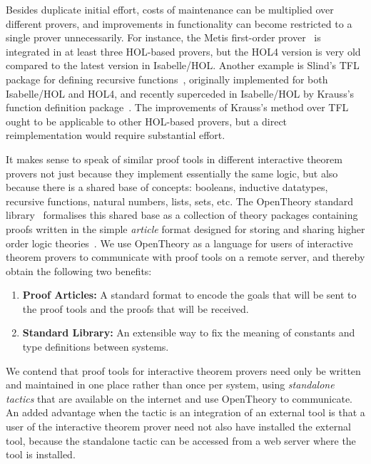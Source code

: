 \documentclass{llncs}
\newcommand{\OpenTheory}{OpenTheory\xspace}
\begin{document}
Besides duplicate initial effort, costs of maintenance can be multiplied over different provers, and improvements in functionality can become restricted to a single prover unnecessarily.
For instance, the Metis first-order prover~\cite{hurd2003d} is integrated in at least three HOL-based provers, but the HOL4 version is very old compared to the latest version in Isabelle/HOL.
Another example is Slind's TFL package for defining recursive functions~\cite{slindphd}, originally implemented for both Isabelle/HOL and HOL4, and recently superceded in Isabelle/HOL by Krauss's function definition package~\cite{DBLP:journals/jar/Krauss10}.
The improvements of Krauss's method over TFL ought to be applicable to other HOL-based provers, but a direct reimplementation would require substantial effort.

It makes sense to speak of similar proof tools in different interactive theorem provers not just because they implement essentially the same logic, but also because there is a shared base of concepts: booleans, inductive datatypes, recursive functions, natural numbers, lists, sets, etc.
The \OpenTheory standard library~\cite{hurd2011} formalises this shared base as a collection of theory packages containing proofs written in the simple \emph{article} format designed for storing and sharing higher order logic theories~\cite{hurd2009}.
We use \OpenTheory as a language for users of interactive theorem provers to communicate with proof tools on a remote server, and thereby obtain the following two benefits:
\begin{enumerate}
\item\textbf{Proof Articles:} A standard format to encode the goals that will be sent to the proof tools and the proofs that will be received.

\item\textbf{Standard Library:} An extensible way to fix the meaning of constants and type definitions between systems.
\end{enumerate}

We contend that proof tools for interactive theorem provers need only be written and maintained in one place rather than once per system, using \emph{standalone tactics} that are available on the internet and use \OpenTheory to communicate.
An added advantage when the tactic is an integration of an external tool is that a user of the interactive theorem prover need not also have installed the external tool, because the standalone tactic can be accessed from a web server where the tool is installed.
\end{document}
